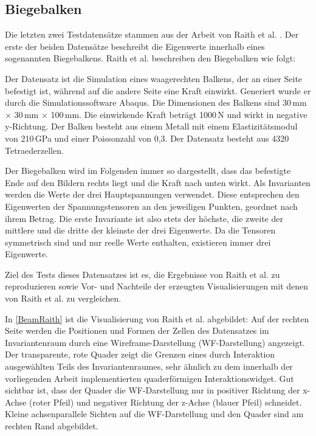\documentclass[a4paper,fontsize=12pt,toc=bib,parskip=half,ngerman]{scrartcl}
\begin{document}
\subsection{Biegebalken}
Die letzten zwei Testdatens\"atze stammen aus der Arbeit von Raith et al. \cite{raith2019tensor}. Der erste der beiden Datens\"atze beschreibt die Eigenwerte innerhalb eines sogenannten Biegebalkens. Raith et al. beschreiben den Biegebalken wie folgt\cite[S.~1128]{raith2019tensor}: 

Der Datensatz ist die Simulation eines waagerechten Balkens, der an einer Seite befestigt ist, w\"ahrend auf die andere Seite eine Kraft einwirkt. Generiert wurde er durch die Simulationssoftware Abaqus\cite{abaqusWebsite}. Die Dimensionen des Balkens sind 30\,mm $\times$ 30\,mm $\times$ 100\,mm. Die einwirkende Kraft betr\"agt 1000\,N und wirkt in negative y-Richtung. Der Balken besteht aus einem Metall mit einem Elastizit\"atsmodul von 210\,GPa und einer Poissonzahl von 0,3. Der Datensatz besteht aus 4320 Tetraederzellen.

Der Biegebalken wird im Folgenden immer so dargestellt, dass das befestigte Ende auf den Bildern rechts liegt und die Kraft nach unten wirkt. Als Invarianten werden die Werte der drei Hauptspannungen verwendet. Diese entsprechen den Eigenwerten der Spannungstensoren an den jeweiligen Punkten, geordnet nach ihrem Betrag. Die erste Invariante ist also stets der h\"ochste, die zweite der mittlere und die dritte der kleinste der drei Eigenwerte. Da die Tensoren symmetrisch sind und nur reelle Werte enthalten, existieren immer drei Eigenwerte.

Ziel des Tests dieses Datensatzes ist es, die Ergebnisse von Raith et al. zu reproduzieren sowie Vor- und Nachteile der erzeugten Visualisierungen mit denen von Raith et al. zu vergleichen.

In \cref{BeamRaith} ist die Visualisierung von Raith et al. abgebildet: Auf der rechten Seite werden die Positionen und Formen der Zellen des Datensatzes im Invariantenraum durch eine Wireframe-Darstellung (WF-Darstellung) angezeigt. Der transparente, rote Quader zeigt die Grenzen eines durch Interaktion ausgew\"ahlten Teils des Invariantenraumes, sehr \"ahnlich zu dem innerhalb der vorliegenden Arbeit implementierten quaderf\"ormigen Interaktionswidget. Gut sichtbar ist, dass der Quader die WF-Darstellung nur in positiver Richtung der x-Achse (roter Pfeil) und negativer Richtung der z-Achse (blauer Pfeil) schneidet. Kleine achsenparallele Sichten auf die WF-Darstellung und den Quader sind am rechten Rand abgebildet.
\end{document}
